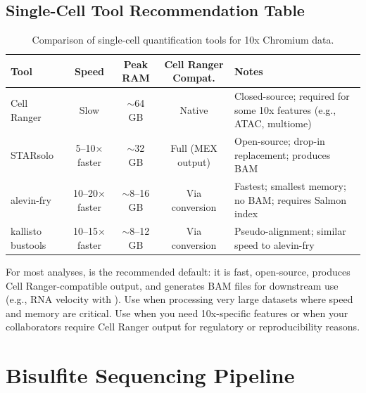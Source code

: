 \subsection{Single-Cell Tool Recommendation Table}

\begin{table}[htbp]
\centering
\caption{Comparison of single-cell quantification tools for 10x Chromium data.}
\label{tab:sc-tools}
\small
\renewcommand{\arraystretch}{1.3}
\begin{tabularx}{\textwidth}{@{}l c c c X@{}}
\toprule
\textbf{Tool} & \textbf{Speed} & \textbf{Peak RAM} & \textbf{Cell Ranger Compat.} & \textbf{Notes} \\
\midrule
Cell Ranger & Slow & $\sim$64 GB & Native & Closed-source; required for some 10x features (e.g., ATAC, multiome) \\
\addlinespace
STARsolo & 5--10$\times$ faster & $\sim$32 GB & Full (MEX output) & Open-source; drop-in replacement; produces BAM \\
\addlinespace
alevin-fry & 10--20$\times$ faster & $\sim$8--16 GB & Via conversion & Fastest; smallest memory; no BAM; requires Salmon index \\
\addlinespace
kallisto bustools & 10--15$\times$ faster & $\sim$8--12 GB & Via conversion & Pseudo-alignment; similar speed to alevin-fry \\
\bottomrule
\end{tabularx}
\end{table}

\begin{tipbox}[title={Which Tool to Choose?}]
For most analyses,  is the recommended default: it is fast, open-source, produces Cell Ranger-compatible output, and generates BAM files for downstream use (e.g., RNA velocity with ). Use  when processing very large datasets where speed and memory are critical. Use  when you need 10x-specific features or when your collaborators require Cell Ranger output for regulatory or reproducibility reasons.
\end{tipbox}

\section{Bisulfite Sequencing Pipeline}
\label{sec:wf:bs}

